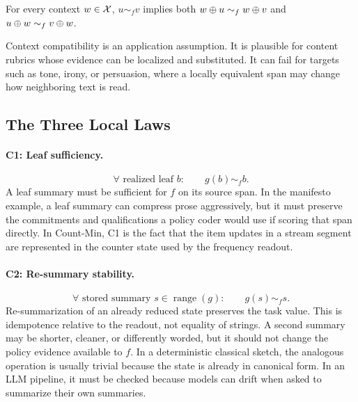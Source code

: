\begin{assumption}\label{ass:context}
For every context $w\in\mathcal{X}$, $u\sim_f v$ implies both
$w\oplus u\sim_f w\oplus v$ and
$u\oplus w\sim_f v\oplus w$.
\end{assumption}

Context compatibility is an application assumption. It is plausible for
content rubrics whose evidence can be localized and substituted. It can fail
for targets such as tone, irony, or persuasion, where a locally equivalent
span may change how neighboring text is read.

\subsection{The Three Local Laws}

\paragraph{C1: Leaf sufficiency.}
\begin{equation*}\tag{C1}
  \forall\text{ realized leaf }b:\qquad g(b)\sim_f b.
\end{equation*}
A leaf summary must be sufficient for $f$ on its source span. In the manifesto
example, a leaf summary can compress prose aggressively, but it must preserve
the commitments and qualifications a policy coder would use if scoring that
span directly. In Count-Min, C1 is the fact that the item updates in a stream
segment are represented in the counter state used by the frequency readout.

\paragraph{C2: Re-summary stability.}
\begin{equation*}\tag{C2}
  \forall\text{ stored summary }s\in\operatorname{range}(g):\qquad
  g(s)\sim_f s.
\end{equation*}
Re-summarization of an already reduced state preserves the task value. This
is idempotence relative to the readout, not equality of strings. A second
summary may be shorter, cleaner, or differently worded, but it should not
change the policy evidence available to $f$. In a deterministic classical
sketch, the analogous operation is usually trivial because the state is
already in canonical form. In an LLM pipeline, it must be checked because
models can drift when asked to summarize their own summaries.


